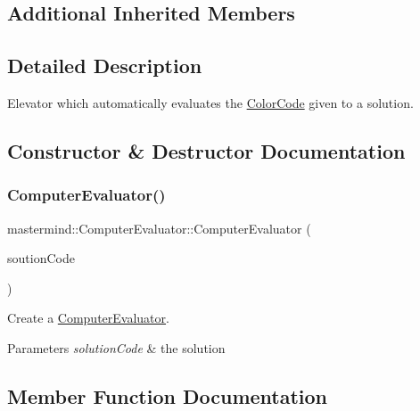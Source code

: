 \subsection*{Additional Inherited Members}


\subsection{Detailed Description}
Elevator which automatically evaluates the \hyperlink{classmastermind_1_1_color_code}{Color\+Code} given to a solution. 

\subsection{Constructor \& Destructor Documentation}
\hypertarget{classmastermind_1_1_computer_evaluator_af0d7d2096b2eb790ee04bd426c39be3f}{}\label{classmastermind_1_1_computer_evaluator_af0d7d2096b2eb790ee04bd426c39be3f} 
\subsubsection{\texorpdfstring{Computer\+Evaluator()}{ComputerEvaluator()}}
{\footnotesize\ttfamily mastermind\+::\+Computer\+Evaluator\+::\+Computer\+Evaluator (\begin{DoxyParamCaption}\item[{\hyperlink{classmastermind_1_1_color_code}{Color\+Code}}]{soution\+Code }\end{DoxyParamCaption})}



Create a \hyperlink{classmastermind_1_1_computer_evaluator}{Computer\+Evaluator}. 


\begin{DoxyParams}{Parameters}
{\em solution\+Code} & the solution \\
\hline
\end{DoxyParams}


\subsection{Member Function Documentation}
\hypertarget{classmastermind_1_1_computer_evaluator_a62617d1ae59e1bfab0b980e7d1864f71}{}\label{classmastermind_1_1_computer_evaluator_a62617d1ae59e1bfab0b980e7d1864f71} 
